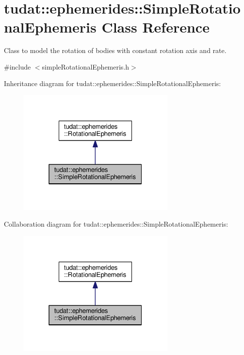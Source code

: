 \hypertarget{classtudat_1_1ephemerides_1_1SimpleRotationalEphemeris}{}\section{tudat\+:\+:ephemerides\+:\+:Simple\+Rotational\+Ephemeris Class Reference}
\label{classtudat_1_1ephemerides_1_1SimpleRotationalEphemeris}


Class to model the rotation of bodies with constant rotation axis and rate.  




{\ttfamily \#include $<$simple\+Rotational\+Ephemeris.\+h$>$}



Inheritance diagram for tudat\+:\+:ephemerides\+:\+:Simple\+Rotational\+Ephemeris\+:
\nopagebreak
\begin{figure}[H]
\begin{center}
\leavevmode
\includegraphics[width=223pt]{classtudat_1_1ephemerides_1_1SimpleRotationalEphemeris__inherit__graph}
\end{center}
\end{figure}


Collaboration diagram for tudat\+:\+:ephemerides\+:\+:Simple\+Rotational\+Ephemeris\+:
\nopagebreak
\begin{figure}[H]
\begin{center}
\leavevmode
\includegraphics[width=223pt]{classtudat_1_1ephemerides_1_1SimpleRotationalEphemeris__coll__graph}
\end{center}
\end{figure}

